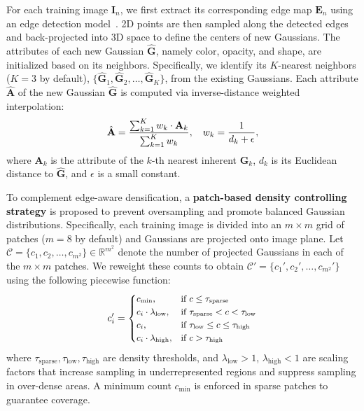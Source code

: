 For each training image $\mathbf{I}_{n}$, we first extract its corresponding edge map $\mathbf{E}_{n}$ using an edge detection model~\cite{liufu2025sauge}. 2D points are then sampled along the detected edges and back-projected into 3D space to define the centers of new Gaussians. The attributes of each new Gaussian $\hat{\mathbf{G}}$, namely color, opacity, and shape, are initialized based on its neighbors. Specifically, we identify its $K$-nearest neighbors ($K=3$ by default), $\{\hat{\mathbf{G}}_{1}, \hat{\mathbf{G}}_{2},\dots, \hat{\mathbf{G}}_{K}\}$, from the existing Gaussians. Each attribute $\hat{\mathbf{A}}$ of the new Gaussian $\hat{\mathbf{G}}$ is computed via inverse-distance weighted interpolation:
\begin{equation}
\small
\hat{\mathbf{A}} = \frac{\sum_{k=1}^{K} w_{k} \cdot \mathbf{A}_{k}}{\sum_{k=1}^{K} w_{k}}, \quad w_{k} = \frac{1}{d_{k} + \epsilon},
\end{equation}
where $\mathbf{A}_{k}$ is the attribute of the $k$-th nearest inherent $\mathbf{G}_{k}$, $d_{k}$ is its Euclidean distance to $\hat{\mathbf{G}}$, and $\epsilon$ is a small constant. 

To complement edge-aware densification, a \textbf{patch-based density controlling strategy} is proposed to prevent oversampling and promote balanced Gaussian distributions. Specifically, each training image is divided into an $m \times m$ grid of patches ($m=8$ by default) and Gaussians are projected onto image plane. Let $\mathcal{C} = \{ c_1, c_2, \ldots, c_{m^2} \} \in \mathbb{R}^{m^2}$ denote the number of projected Gaussians in each of the $m \times m$ patches. We reweight these counts to obtain $\mathcal{C'} = \{ c_1', c_2', \ldots, c_{m^2}' \}$ using the following piecewise function:
\begin{equation}
\small
c_i' =
\begin{cases}
c_{\mathrm{min}}, & \text{if } c \leq \tau_{\mathrm{sparse}} \\
c_i \cdot \lambda_{\mathrm{low}}, & \text{if } \tau_{\mathrm{sparse}} < c < \tau_{\mathrm{low}} \\
c_i, & \text{if } \tau_{\mathrm{low}} \leq c \leq \tau_{\mathrm{high}} \\
c_i \cdot \lambda_{\mathrm{high}}, & \text{if } c > \tau_{\mathrm{high}}
\end{cases}
\end{equation}
where $\tau_{\mathrm{sparse}}, \tau_{\mathrm{low}}, \tau_{\mathrm{high}}$ are density thresholds, and $\lambda_{\mathrm{low}} > 1$, $\lambda_{\mathrm{high}} < 1$ are scaling factors that increase sampling in underrepresented regions and suppress sampling in over-dense areas. A minimum count $c_{\mathrm{min}}$ is enforced in sparse patches to guarantee coverage.

